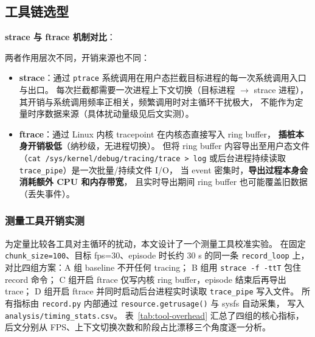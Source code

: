 \subsection{工具链选型}\label{sec:tool-selection}

\textbf{strace 与 ftrace 机制对比}：

两者作用层次不同，开销来源也不同：

\begin{itemize}[leftmargin=2em]
  \item \textbf{strace}：通过 \texttt{ptrace} 系统调用在用户态拦截目标进程的每一次系统调用入口与出口。
        每次拦截都需要一次进程上下文切换（目标进程 $\to$ strace 进程），
        其开销与系统调用频率正相关，频繁调用时对主循环干扰极大，
        不能作为定量时序数据来源（具体扰动量级见后文实测）。

  \item \textbf{ftrace}：通过 Linux 内核 tracepoint 在内核态直接写入 ring buffer，
        \textbf{插桩本身开销极低}（纳秒级，无进程切换）。
        但将 ring buffer 内容导出至用户态文件
        （\texttt{cat /sys/kernel/debug/tracing/trace > log}
        或后台进程持续读取 \texttt{trace\_pipe}）是一次批量/持续文件 I/O，
        当 event 密集时，\textbf{导出过程本身会消耗额外 CPU 和内存带宽}，
        且实时导出期间 ring buffer 也可能覆盖旧数据（丢失事件）。
\end{itemize}

\subsubsection*{测量工具开销实测}

为定量比较各工具对主循环的扰动，本文设计了一个测量工具校准实验。
在固定 \texttt{chunk\_size=100}、目标 fps=30、episode 时长约 30 s 的同一条 \texttt{record\_loop} 上，
对比四组方案：A 组 baseline 不开任何 tracing；
B 组用 \texttt{strace -f -ttT} 包住 record 命令；
C 组开启 ftrace 仅写内核 ring buffer，episode 结束后再导出 trace；
D 组开启 ftrace 并同时启动后台进程实时读取 \texttt{trace\_pipe} 写入文件。
所有指标由 \texttt{record.py} 内部通过 \texttt{resource.getrusage()} 与 sysfs 自动采集，
写入 \texttt{analysis/timing\_stats.csv}。
表~\ref{tab:tool-overhead} 汇总了四组的核心指标，
后文分别从 FPS、上下文切换次数和阶段占比漂移三个角度逐一分析。

